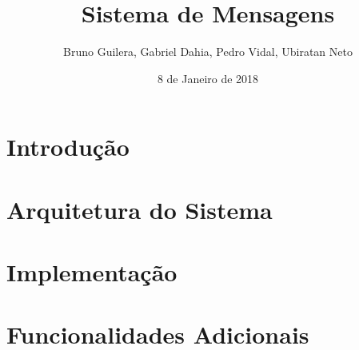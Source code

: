 \documentclass{article}
\title{Sistema de Mensagens}
\author{Bruno Guilera, Gabriel Dahia, Pedro Vidal, Ubiratan Neto}
\date{8 de Janeiro de 2018}
\begin{document}
 
\maketitle
 
\section{Introdução}
 


\section{Arquitetura do Sistema}



\section{Implementação}


 
\section{Funcionalidades Adicionais}
 

 
\end{document}
